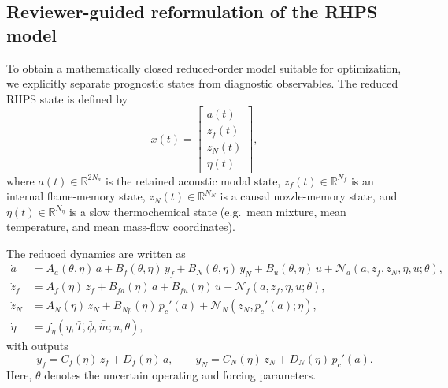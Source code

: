
\subsection{Reviewer-guided reformulation of the RHPS model}
\label{subsec:rhps_reformulation}

To obtain a mathematically closed reduced-order model suitable for optimization,
we explicitly separate prognostic states from diagnostic observables.
The reduced RHPS state is defined by
\begin{equation}
x(t)=
\begin{bmatrix}
a(t)\\
z_f(t)\\
z_N(t)\\
\eta(t)
\end{bmatrix},
\label{eq:rhps_state}
\end{equation}
where
$a(t)\in\mathbb{R}^{2N_a}$ is the retained acoustic modal state,
$z_f(t)\in\mathbb{R}^{N_f}$ is an internal flame-memory state,
$z_N(t)\in\mathbb{R}^{N_N}$ is a causal nozzle-memory state,
and $\eta(t)\in\mathbb{R}^{N_\eta}$ is a slow thermochemical state
(e.g.\ mean mixture, mean temperature, and mean mass-flow coordinates).

The reduced dynamics are written as
\begin{align}
\dot a
&=
A_a(\theta,\eta)\,a
+
B_f(\theta,\eta)\,y_f
+
B_N(\theta,\eta)\,y_N
+
B_u(\theta,\eta)\,u
+
\mathcal{N}_a(a,z_f,z_N,\eta,u;\theta),
\label{eq:rhps_a}
\\
\dot z_f
&=
A_f(\eta)\,z_f
+
B_{fa}(\eta)\,a
+
B_{fu}(\eta)\,u
+
\mathcal{N}_f(a,z_f,\eta,u;\theta),
\label{eq:rhps_zf}
\\
\dot z_N
&=
A_N(\eta)\,z_N
+
B_{Np}(\eta)\,p_c'(a)
+
\mathcal{N}_N(z_N,p_c'(a);\eta),
\label{eq:rhps_zn}
\\
\dot\eta
&=
f_\eta(\eta,\bar T,\bar\phi,\bar{\dot m};u,\theta),
\label{eq:rhps_eta}
\end{align}
with outputs
\begin{equation}
y_f = C_f(\eta)\,z_f + D_f(\eta)\,a,
\qquad
y_N = C_N(\eta)\,z_N + D_N(\eta)\,p_c'(a).
\label{eq:rhps_outputs}
\end{equation}
Here, $\theta$ denotes the uncertain operating and forcing parameters.

